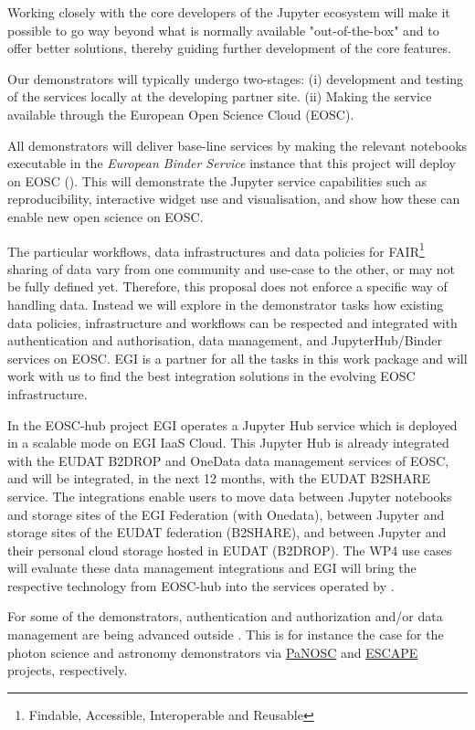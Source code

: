 \begin{workpackage}
\begin{wpdescription}
  Working closely with the core developers of the Jupyter ecosystem will make it possible to
  go way beyond what is normally available "out-of-the-box" and to offer better solutions,
  thereby guiding further development of the core features.

  \medskip
  Our demonstrators will typically undergo two-stages: (i)
  development and testing of the services locally at the developing partner
  site. (ii) Making the service available through the European Open
  Science Cloud (EOSC).

  All demonstrators will deliver base-line services by making the
  relevant notebooks executable in the \emph{European Binder Service} instance that this
  project will deploy on EOSC (). This will demonstrate
  the Jupyter service capabilities such as reproducibility, interactive
  widget use and visualisation, and show how these can
  enable new open science on EOSC.

  The particular workflows, data infrastructures and data policies for
  FAIR\footnote{Findable, Accessible, Interoperable and Reusable} sharing of data vary from one community and use-case to
  the other, or may not be fully defined yet. Therefore, this proposal
  does not enforce a specific way of handling data. Instead we
  will explore in the demonstrator tasks how existing data policies,
  infrastructure and workflows can be respected and integrated with
  authentication and authorisation, data management, and
  JupyterHub/Binder services on EOSC. EGI is a partner
  for all the tasks in this work package and will work with us to find the
  best integration solutions in the evolving EOSC
  infrastructure.

  In the EOSC-hub project EGI operates a Jupyter Hub service which is deployed 
  in a scalable mode on EGI IaaS Cloud. This Jupyter Hub is already integrated 
  with the EUDAT B2DROP and OneData data management services of EOSC, and will 
  be integrated, in the next 12 months, with the EUDAT B2SHARE service.
  The integrations enable users to move data between Jupyter notebooks and storage 
  sites of the EGI Federation (with Onedata), between Jupyter and storage sites 
  of the EUDAT federation (B2SHARE), and between Jupyter and their personal cloud 
  storage hosted in EUDAT (B2DROP). The WP4 use cases will evaluate these data management 
  integrations and EGI will bring the respective technology from EOSC-hub into the 
  services operated by \TheProject.

  For some of the demonstrators, authentication and authorization and/or
  data management are being advanced outside \TheProject.
  This is for instance the case for the photon science and astronomy
  demonstrators via \href{https://panosc-eu.github.io/}{PaNOSC} and
  \href{https://www.eso.org/public/announcements/ann18084/}{ESCAPE} projects, respectively.


\end{wpdescription}
\end{workpackage}
